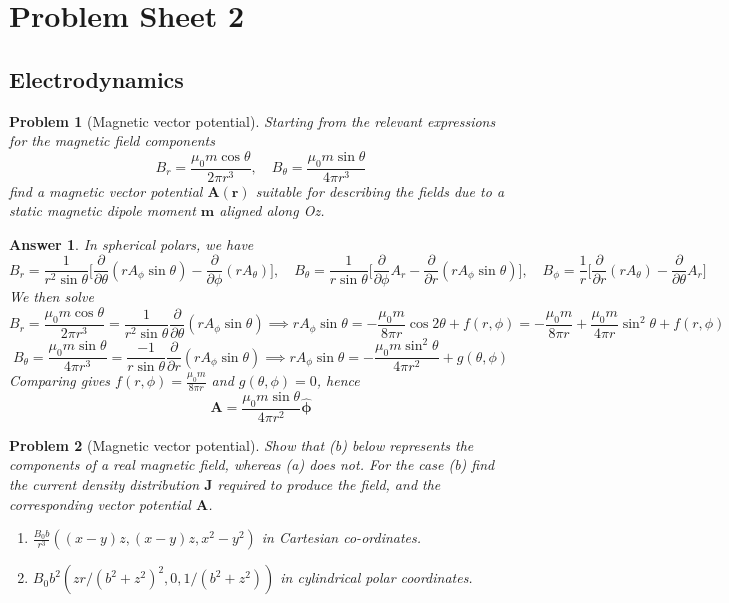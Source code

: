 \documentclass[a4paper]{article}
\newtheorem{ans}{Answer}
\theoremstyle{new}
\newtheorem{qns}{Problem}
\begin{document}
\section{Problem Sheet 2}
\subsection*{Electrodynamics}
\begin{qns}[Magnetic vector potential]
Starting from the relevant expressions for the magnetic field components
$$B_r=\frac{\mu_0m\cos\theta}{2\pi r^3},\quad B_\theta=\frac{\mu_0m\sin\theta}{4\pi r^3}$$
find a magnetic vector potential $\mathbf{A}(\mathbf{r})$ suitable for describing the fields due to a static magnetic dipole moment $\mathbf{m}$ aligned along Oz.
\end{qns}
\begin{ans}
In spherical polars, we have
$$B_r=\frac{1}{r^2\sin\theta}\bigg[\frac{\partial}{\partial\theta}(rA_\phi\sin\theta)-\frac{\partial}{\partial\phi}(rA_\theta)\bigg],\quad B_\theta=\frac{1}{r\sin\theta}\bigg[\frac{\partial}{\partial\phi}A_r-\frac{\partial}{\partial r}(rA_\phi\sin\theta)\bigg],\quad B_\phi=\frac{1}{r}\bigg[\frac{\partial}{\partial r}(rA_\theta)-\frac{\partial}{\partial\theta} A_r\bigg]$$
We then solve
$$B_r=\frac{\mu_0m\cos\theta}{2\pi r^3}=\frac{1}{r^2\sin\theta}\frac{\partial}{\partial\theta}(rA_\phi\sin\theta)\implies rA_\phi\sin\theta=-\frac{\mu_0m}{8\pi r}\cos2\theta+f(r,\phi)=-\frac{\mu_0m}{8\pi r}+\frac{\mu_0m}{4\pi r}\sin^2\theta+f(r,\phi)$$
$$B_\theta=\frac{\mu_0m\sin\theta}{4\pi r^3}=\frac{-1}{r\sin\theta}\frac{\partial}{\partial r}(rA_\phi\sin\theta)\implies rA_\phi\sin\theta=-\frac{\mu_0m\sin^2\theta}{4\pi r^2}+g(\theta,\phi)$$
Comparing gives $f(r,\phi)=\frac{\mu_0m}{8\pi r}$ and $g(\theta,\phi)=0$, hence
$$\mathbf{A}=\frac{\mu_0m\sin\theta}{4\pi r^2}\boldsymbol{\hat{\phi}}$$
\end{ans}
\begin{qns}[Magnetic vector potential]
Show that (b) below represents the components of a real magnetic field, whereas (a) does not. For the case (b) find the current density distribution $\mathbf{J}$ required to produce the field, and the corresponding vector potential $\mathbf{A}$.
\begin{enumerate}[label=(\alph*)]
\item $\frac{B_0b}{r^3}((x-y)z,(x-y)z,x^2-y^2)$ in Cartesian co-ordinates.
\item $B_0b^2(zr/(b^2+z^2)^2,0,1/(b^2+z^2))$ in cylindrical polar coordinates.
\end{enumerate}
\end{qns}
\end{document}

